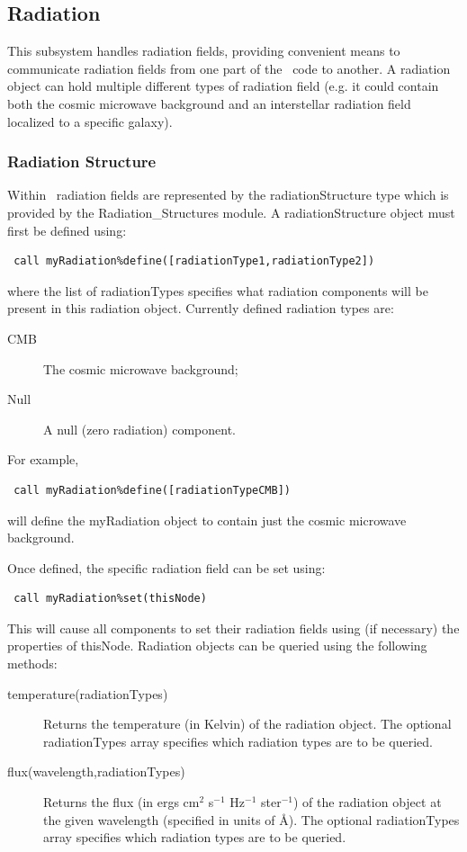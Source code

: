 \subsection{Radiation}\label{sec:RadiationSubsystem}

This subsystem handles radiation fields, providing convenient means to communicate radiation fields from one part of the \glc\ code to another. A radiation object can hold multiple different types of radiation field (e.g. it could contain both the cosmic microwave background and an interstellar radiation field localized to a specific galaxy).

\subsubsection{Radiation Structure}

Within \glc\ radiation fields are represented by the {\normalfont \ttfamily radiationStructure} type which is provided by the {\normalfont \ttfamily Radiation\_Structures} module. A {\normalfont \ttfamily radiationStructure} object must first be defined using:
\begin{verbatim}
 call myRadiation%define([radiationType1,radiationType2])
\end{verbatim}
where the list of {\normalfont \ttfamily radiationType}s specifies what radiation components will be present in this radiation object. Currently defined radiation types are:
\begin{description}
 \item[{\normalfont \ttfamily CMB}] The cosmic microwave background;
 \item[{\normalfont \ttfamily Null}] A null (zero radiation) component.
\end{description}
For example,
\begin{verbatim}
 call myRadiation%define([radiationTypeCMB])
\end{verbatim}
will define the {\normalfont \ttfamily myRadiation} object to contain just the cosmic microwave background.

Once defined, the specific radiation field can be set using:
\begin{verbatim}
 call myRadiation%set(thisNode)
\end{verbatim}
This will cause all components to set their radiation fields using (if necessary) the properties of {\normalfont \ttfamily thisNode}. Radiation objects can be queried using the following methods:
\begin{description}
 \item[{\normalfont \ttfamily temperature(radiationTypes)}] Returns the temperature (in Kelvin) of the radiation object. The optional {\normalfont \ttfamily radiationTypes} array specifies which radiation types are to be queried.
 \item[{\normalfont \ttfamily flux(wavelength,radiationTypes)}] Returns the flux (in ergs cm$^2$ s$^{-1}$ Hz$^{-1}$ ster$^{-1}$) of the radiation object at the given {\normalfont \ttfamily wavelength} (specified in units of \AA). The optional {\normalfont \ttfamily radiationTypes} array specifies which radiation types are to be queried.
\end{description}

